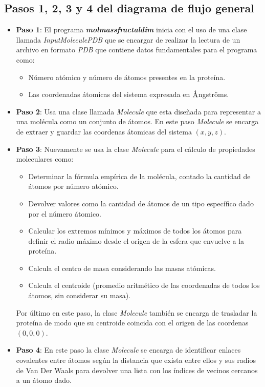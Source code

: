  
 \subsection {Pasos 1, 2, 3 y 4 del diagrama de flujo general}
 
	\begin{itemize}
		\item \textbf{Paso 1}:  El programa \textbf{\textit{molmassfractaldim}} inicia con el
		uso de una clase llamada \textit{InputMoleculePDB} que se encargar de realizar 
		la lectura de un archivo en formato \textit{PDB} que contiene datos 
		fundamentales para el programa como: 
		
		\begin{itemize}
			\item Número atómico y número de átomos presentes en la proteína.
			\item Las coordenadas átomicas del sistema expresada en $\textup{\r{A}}$ngstr\"oms.
		\end{itemize}
		
		\item \textbf{Paso 2}: Usa una clase llamada \textit{Molecule}
		que esta diseñada para representar a una molécula como un conjunto de 
		átomos. En este paso \textit{Molecule} se encarga de extraer y guardar las coordenas átomicas del sistema $(x, y, z)$.\\
		
		\item \textbf{Paso 3}: Nuevamente se usa la clase 
		\textit{Molecule} para el cálculo de propiedades moleculares como:
		
		\begin{itemize}
			\item Determinar la fórmula empírica de la molécula, contado la cantidad de átomos por número atómico.
			\item Devolver valores como la cantidad de átomos de un tipo específico 
			dado por el número átomico.
			\item Calcular los extremos mínimos y máximos de todos los átomos para definir 
			el radio máximo desde el origen de la esfera que envuelve a la proteína.
			\item Calcula el centro de masa considerando las masas atómicas.
			\item Calcula el centroide (promedio aritmético de las coordenadas de todos los
			átomos, sin considerar su masa).
		\end{itemize}
		
		Por último en este paso, la clase \textit{Molecule} también se encarga de trasladar la proteína de modo que su centroide coincida con el origen de las coordenas $(0, 0, 0)$.  
		
		
		\item \textbf{Paso 4}: En este paso la clase \textit{Molecule} se encarga de identificar enlaces covalentes entre átomos según la distancia que exista entre ellos y sus radios de Van Der Waals para devolver una lista con los índices de vecinos cercanos a un átomo dado.
		
	\end{itemize}


